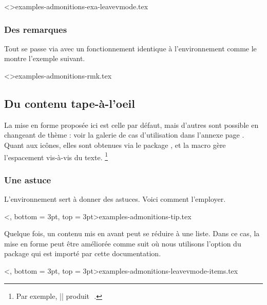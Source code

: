 \tdoclatexinput<>{examples-admonitions-exa-leavevmode.tex}



\subsubsection{Des remarques}

Tout se passe via  avec un fonctionnement identique à l'environnement  comme le montre l'exemple suivant.


\tdoclatexinput<>{examples-admonitions-rmk.tex}


\subsection{Du contenu tape-à-l'oeil}
\label{tutodoc-admonitions}

\begin{tdocnote}
    La mise en forme proposée ici est celle par défaut, mais d'autres sont possible en changeant de thème : voir la galerie de cas d'utilisation dans l'annexe page \pageref{tutodoc-theme-gallery}.
    Quant aux icônes, elles sont obtenues via le package , et la macro  gère l'espacement vis-à-vis du texte.%
    \footnote{
        Par exemple,
        \tdoclatexin||
        produit\,
        \,.
    }
\end{tdocnote}



\subsubsection{Une astuce}

L'environnement  sert à donner des astuces. Voici comment l'employer.

\tdoclatexinput<, bottom = 3pt, top = 3pt>{examples-admonitions-tip.tex}


\smallskip


\begin{tdoctip}
    Quelque fois, un contenu mis en avant peut se réduire à une liste. Dans ce cas, la mise en forme peut être améliorée comme suit où nous utilisons l'option  du package  qui est importé par cette documentation.

    \tdoclatexinput<, bottom = 3pt, top = 3pt>{examples-admonitions-leavevmode-items.tex}
\end{tdoctip}



